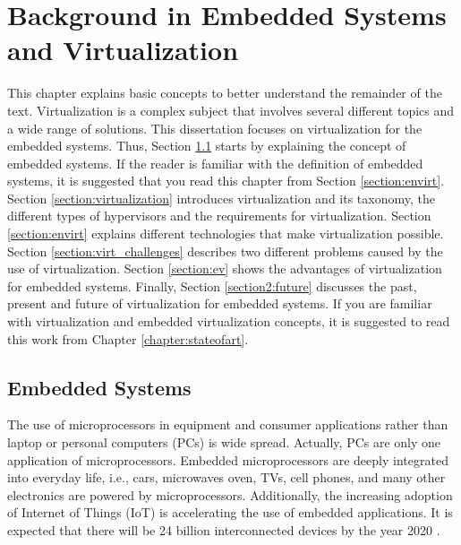\chapter{\label{chapter:background}Background in Embedded Systems and Virtualization}


This chapter explains basic concepts to better understand the remainder of the text. Virtualization is a complex subject that involves several different topics and a wide range of solutions. This dissertation focuses on virtualization for the embedded systems. Thus, Section \ref{section:es} starts by explaining the concept of embedded systems. If the reader is familiar with the definition of embedded systems, it is suggested that you read this chapter from Section \ref{section:envirt}. Section \ref{section:virtualization} introduces virtualization and its taxonomy, the different types of hypervisors and the requirements for virtualization. Section \ref{section:envirt} explains different technologies that make virtualization possible. Section \ref{section:virt_challenges} describes two different problems caused by the use of virtualization. Section \ref{section:ev} shows the advantages of virtualization for embedded systems. Finally, Section \ref{section2:future} discusses the past, present and future of virtualization for embedded systems. If you are familiar with virtualization and embedded virtualization concepts, it is suggested to read this work from Chapter \ref{chapter:stateofart}.

\section{Embedded Systems}
\label{section:es}

The use of microprocessors in equipment and consumer applications rather than laptop or personal computers (PCs) is wide spread. Actually, PCs are only one application of microprocessors. Embedded microprocessors are deeply integrated into everyday life, i.e., cars, microwaves oven, TVs, cell phones, and many other electronics are powered by microprocessors. Additionally, the increasing adoption of Internet of Things (IoT) \cite{gubbi2013} is accelerating the use of embedded applications. It is expected that there will be 24 billion interconnected devices by the year 2020 \cite{gubbi2013}. 

